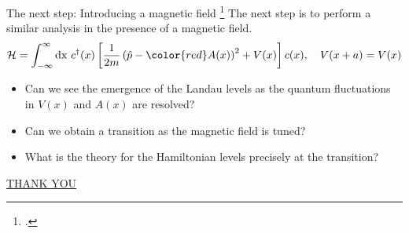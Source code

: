 \documentclass[aspectratio=169]{beamer}
\begin{document}
\begin{frame}{The next step: Introducing a magnetic field}
	\footcite{thouless1982quantized}
	The next step is to perform a similar analysis in the presence of a \alert{magnetic field}.
	\[\mathcal{H} = \int_{-\infty}^{\infty}\mathrm{dx}~c^\dagger(x)\left[\frac{1}{2m}\left(\hat p - {\color{red}A(x)}\right)^2 + V(x)\right]c(x),\quad V(x+a) = V(x)\]
	\begin{itemize}
		\item Can we see the emergence of the \alert{Landau levels} as the quantum fluctuations in \(V(x)\) and \(A(x)\) are resolved?\\[10pt]
		\item Can we obtain a \alert{transition} as the magnetic field is tuned? \\[10pt]
		\item What is the \alert{theory} for the Hamiltonian levels precisely at the transition?
	\end{itemize}
\end{frame}

\begin{frame}{}

\vspace*{\fill}
\LARGE{\underline{THANK YOU}}

\vspace*{\fill}
\printbibliography[heading=none]
\end{frame}
\end{document}
